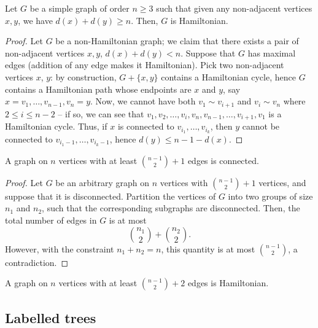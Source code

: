 \documentclass[11pt]{article}
\theoremstyle{definition}
\theoremstyle{remark}
\numberwithin{equation}{section}
\begin{document}
    \begin{theorem}
        Let $G$ be a simple graph of order $n \geq 3$ such that given any
        non-adjacent vertices $x, y$, we have $d(x) + d(y) \geq n$. Then, $G$ is
        Hamiltonian.
    \end{theorem}
    \begin{proof}
        Let $G$ be a non-Hamiltonian graph; we claim that there exists a pair of
        non-adjacent vertices $x, y$, $d(x) + d(y) < n$. Suppose that $G$ has maximal
        edges (addition of any edge makes it Hamiltonian). Pick two non-adjacent
        vertices $x$, $y$: by construction, $G + \{x, y\}$ contains a Hamiltonian
        cycle, hence $G$ contains a Hamiltonian path whose endpoints are $x$ and $y$,
        say $x = v_1, \dots, v_{n - 1}, v_n = y$. Now, we cannot have both $v_1 \sim
        v_{i + 1}$ and $v_i \sim v_n$ where $2 \leq i \leq n - 2$ -- if so, we can
        see that $v_1, v_2, \dots, v_i, v_n, v_{n - 1}, \dots, v_{i + 1}, v_1$ is a
        Hamiltonian cycle. Thus, if $x$ is connected to $v_{i_1}, \dots, v_{i_k}$, then
        $y$ cannot be connected to $v_{i_1 - 1}, \dots, v_{i_k - 1}$, hence $d(y)
        \leq n - 1 - d(x)$.
    \end{proof}

    \begin{lemma}
        A graph on $n$ vertices with at least $\binom{n - 1}{2} + 1$ edges is
        connected.
    \end{lemma}
    \begin{proof}
        Let $G$ be an arbitrary graph on $n$ vertices with $\binom{n - 1}{2} + 1$
        vertices, and suppose that it is disconnected. Partition the vertices of $G$
        into two groups of size $n_1$ and $n_2$, such that the corresponding
        subgraphs are disconnected. Then, the total number of edges in $G$ is at most
        \[
            \binom{n_1}{2} + \binom{n_2}{2}.
        \] However, with the constraint $n_1 + n_2 = n$, this quantity is at most
        $\binom{n - 1}{2}$, a contradiction.
    \end{proof}

    \begin{lemma}
        A graph on $n$ vertices with at least $\binom{n - 1}{2} + 2$ edges is
        Hamiltonian.
    \end{lemma}


    \subsection{Labelled trees}
    
\end{document}
